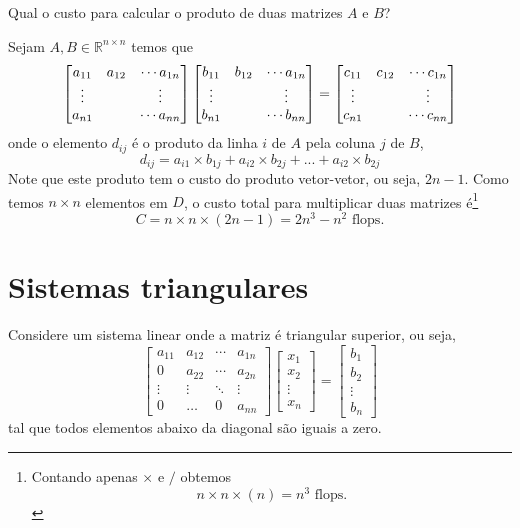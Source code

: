 \begin{ex}
Qual o custo para calcular o produto de duas matrizes  $A$ e $B$?
\end{ex}
\begin{sol}
Sejam $A, B \in \mathbb{R}^{n\times n}$ temos que
\begin{equation}
  \begin{bmatrix} a_{11}&a_{12}&\cdots a_{1n} \\ \vdots&&\vdots \\ a_{n1}&&\cdots a_{nn} \end{bmatrix}
  \begin{bmatrix} b_{11}&b_{12}&\cdots a_{1n} \\ \vdots&&\vdots \\ b_{n1}&&\cdots b_{nn} \end{bmatrix}
 =\begin{bmatrix} c_{11}&c_{12}&\cdots c_{1n} \\ \vdots&&\vdots \\ c_{n1}&&\cdots c_{nn} \end{bmatrix}
\end{equation}
onde o elemento $d_{ij}$ é o produto da linha $i$ de $A$ pela coluna $j$ de $B$,
\begin{equation}
  d_{ij}=  a_{i1}\times b_{1j} + a_{i2}\times b_{2j} +...+a_{i2}\times b_{2j}
\end{equation}
Note que este produto tem o custo do produto vetor-vetor, ou seja, $2n-1$. Como temos $n\times n$ elementos em $D$, o custo total para multiplicar duas matrizes é\footnote{Contando apenas $\times$ e $/$ obtemos
\begin{equation}
  n\times n \times(n)  = n^3 \text{~flops.}
\end{equation}
}
\begin{equation}
  C= n\times n \times (2n-1)= 2n^3-n^2 \text{~flops.}
\end{equation}

\end{sol}


\section{Sistemas triangulares}
Considere um sistema linear onde a matriz é triangular superior, ou seja,
$$\begin{bmatrix}
a_{11} & a_{12} & \cdots & a_{1n}\\
0      & a_{22} & \cdots & a_{2n}\\
\vdots & \vdots & \ddots & \vdots\\
0      & \dots  & 0     & a_{nn}
\end{bmatrix}
\begin{bmatrix}
x_{1} \\
x_{2} \\
\vdots \\
x_{n}
\end{bmatrix}
 =\begin{bmatrix}
b_{1} \\
b_{2} \\
\vdots \\
b_{n}
\end{bmatrix}
$$
tal que todos elementos abaixo da diagonal são iguais a zero.

